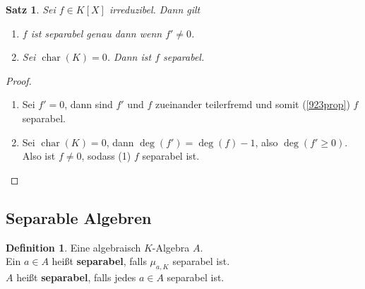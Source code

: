 \documentclass[10pt,a4paper]{article}
\newcounter{thm}[section]
\theoremstyle{definition}
\newtheorem{definition}[thm]{Definition}
\theoremstyle{plain}
\newtheorem{satz}[thm]{Satz}
\theoremstyle{remark}
\begin{document}
\begin{satz}\label{924satz}
	Sei $f\in K[X]$ irreduzibel. Dann gilt
	\begin{enumerate}
		\item $f$ ist separabel genau dann wenn $f'\neq 0$.
		\item Sei $\operatorname{char}(K)=0$. Dann ist $f$ separabel.
	\end{enumerate}
\end{satz}
\begin{proof}
	\begin{enumerate}
		\item Sei $f'=0$, dann sind $f'$ und $f$ zueinander teilerfremd und somit (\ref{923prop}) $f$ separabel.
		\item Sei $\operatorname{char}(K)=0$, dann $\deg(f')=\deg(f)-1$, also $\deg(f'\geq 0)$.\\
		Also ist $f\neq 0$, sodass (1) $f$ separabel ist.
	\end{enumerate}
\end{proof}



\subsection{Separable Algebren}

\begin{definition}
	Eine algebraisch $K$-Algebra $A$.\\
	Ein $a\in A$ heißt \textbf{separabel}, falls $\mu_{a,K}$ separabel ist.\\
	$A$ heißt \textbf{separabel}, falls jedes $a\in A$ separabel ist.
\end{definition}
\end{document}

